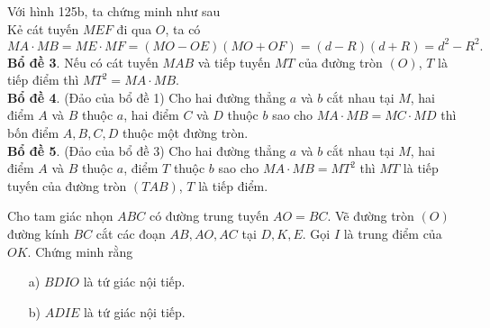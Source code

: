 Với hình 125b, ta chứng minh như sau \\
Kẻ cát tuyến $MEF$ đi qua $O$, ta có 
$$MA \cdot MB=ME \cdot MF = (MO-OE)(MO+OF)=(d-R)(d+R)=d^2-R^2.$$ 
\textbf{Bổ đề 3}. Nếu có cát tuyến $MAB$ và tiếp tuyến $MT$ của đường tròn $(O)$, $T$ là tiếp điểm thì $MT^2= MA \cdot MB.$ \\
\textbf{Bổ đề 4}. (Đảo của bổ đề 1) Cho hai đường thẳng $a$ và $b$ cắt nhau tại $M$, hai điểm $A$ và $B$ thuộc $a$, hai điểm $C$ và $D$ thuộc $b$ sao cho $MA \cdot MB =MC \cdot MD $ thì bốn điểm $A,B,C,D$  thuộc một đường tròn. \\
\textbf{Bổ đề 5}. (Đảo của bổ đề 3) Cho hai đường thẳng $a$ và $b$ cắt nhau tại $M$, hai điểm $A$ và $B$ thuộc $a$, điểm $T$ thuộc $b$ sao cho $MA \cdot MB=MT^2$ thì $MT$ là tiếp tuyến của đường tròn $(TAB)$, $T$ là tiếp điểm. 
\setcounter{vd}{104}
\begin{vd}
	Cho tam giác nhọn $ABC$ có đường trung tuyến  $AO=BC$. Vẽ đường tròn $(O)$ đường kính $BC$ cắt các đoạn $AB,AO,AC$ tại $D,K,E$. Gọi $I$ là trung điểm của $OK$. Chứng minh rằng 
	\begin{enumerate}
		\item[a)] $BDIO$ là tứ giác nội tiếp. 
		\item[b)] $ADIE$ là tứ giác nội tiếp. 
	\end{enumerate}
\end{vd}

